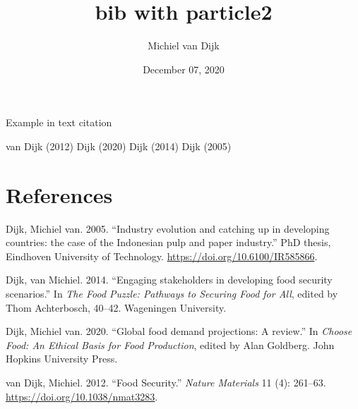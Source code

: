 \documentclass[
]{article}
\title{bib with particle2}
\author{Michiel van Dijk}
\date{December 07, 2020}
\begin{document}
\maketitle

\usepackage[style=apa]{biblatex}

Example in text citation

van Dijk (2012) Dijk (2020) Dijk (2014) Dijk (2005)

\hypertarget{references}{%
\section*{References}\label{references}}

\hypertarget{refs}{}
\leavevmode\hypertarget{ref-VanDijk2005}{}%
Dijk, Michiel van. 2005. ``Industry evolution and catching up in
developing countries: the case of the Indonesian pulp and paper
industry.'' PhD thesis, Eindhoven University of Technology.
\url{https://doi.org/10.6100/IR585866}.

\leavevmode\hypertarget{ref-VanDijk2014a}{}%
Dijk, van Michiel. 2014. ``Engaging stakeholders in developing food
security scenarios.'' In \emph{The Food Puzzle: Pathways to Securing
Food for All}, edited by Thom Achterbosch, 40--42. Wageningen
University.

\leavevmode\hypertarget{ref-VanDijk2020a}{}%
Dijk, Michiel van. 2020. ``Global food demand projections: A review.''
In \emph{Choose Food: An Ethical Basis for Food Production}, edited by
Alan Goldberg. John Hopkins University Press.

\leavevmode\hypertarget{ref-vanDijk2012}{}%
van Dijk, Michiel. 2012. ``Food Security.'' \emph{Nature Materials} 11
(4): 261--63. \url{https://doi.org/10.1038/nmat3283}.
\end{document}
